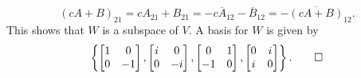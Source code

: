 \begin{enumerate}
\begin{solution}
    \begin{equation*}
      (cA + B)_{21} = cA_{21} + B_{21}
      = -c\overline{A}_{12} - \overline{B}_{12}
      = -\overline{(cA + B)}_{12}.
    \end{equation*}
    This shows that $W$ is a subspace of $V$. A basis for $W$ is given
    by
    \begin{equation*}
      \left\{
        \begin{bmatrix}
          1 & 0 \\ 0 & -1
        \end{bmatrix},
        \begin{bmatrix}
          i & 0 \\ 0 & -i
        \end{bmatrix},
        \begin{bmatrix}
          0 & 1 \\ -1 & 0
        \end{bmatrix},
        \begin{bmatrix}
          0 & i \\ i & 0
        \end{bmatrix}
      \right\}. \qedhere
    \end{equation*}
  \end{solution}
\end{enumerate}
